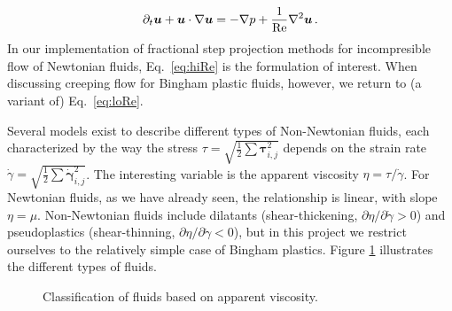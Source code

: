 \documentclass[final,3p,twocolumn]{elsarticle}
\begin{document}
\begin{equation}
    \partial_t \bm{u} + \bm{u} \cdot \nabla \bm{u} = - \nabla p
    + \frac{1}{\rm Re} \nabla^2 \bm {u} \,.
    \label{eq:hiRe}
\end{equation}
%
In our implementation of fractional step projection methods for incompresible
flow of Newtonian fluids, Eq.\ \eqref{eq:hiRe} is the formulation of interest.
When discussing creeping flow for Bingham plastic fluids, however, we return to
(a variant of) Eq.\ \eqref{eq:loRe}. 

Several models exist to describe different types of Non-Newtonian fluids, each
characterized by the way the stress $\tau = \sqrt{\frac{1}{2} \sum
\bm{\tau}_{i,j}^2}$ depends on the strain rate $\dot{\gamma} =
\sqrt{\frac{1}{2} \sum \dot{\bm{\gamma}}_{i,j}^2}$. The interesting variable is
the apparent viscosity $\eta = \tau/ \dot{\gamma}$. For Newtonian fluids, as we
have already seen, the relationship is linear, with slope $\eta = \mu$.
Non-Newtonian fluids include dilatants (shear-thickening, $\partial
\eta/\partial \dot{\gamma} > 0$) and pseudoplastics (shear-thinning, $\partial
\eta/\partial \dot{\gamma} < 0$), but in this project we restrict ourselves to
the relatively simple case of Bingham plastics. Figure \ref{fig:fluids}
illustrates the different types of fluids. 

\begin{figure}[htb]
    \centering
    \caption{Classification of fluids based on apparent viscosity.}
    \label{fig:fluids}
\end{figure}
\end{document}

